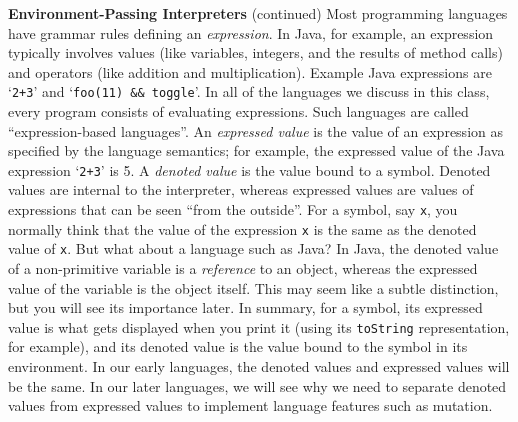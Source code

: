 \begin{minipage}[t]{\sw}
\slidenumber
\LARGE
{\bf Environment-Passing Interpreters} (continued)\exx
\Large
Most programming languages
have grammar rules defining an {\em expression}.
In Java, for example, an expression typically involves values
(like variables, integers, and the results of method calls) and operators
(like addition and multiplication).
Example Java expressions are `\verb'2+3'' and `\verb'foo(11) && toggle''.
In all of the languages we discuss in this class,
every program consists of evaluating expressions.
Such languages are called ``expression-based languages''.\exx
An {\em expressed value} is the value of an expression
as specified by the language semantics;
for example,
the expressed value of the Java expression `\verb'2+3'' is 5.
A {\em denoted value} is the value bound to a symbol.
Denoted values are internal to the interpreter,
whereas expressed values are values
of expressions that can be seen ``from the outside''.\exx
For a symbol, say \verb'x', you normally think
that the value of the expression \verb'x' is the same
as the denoted value of \verb'x'.
But what about a language such as Java?
In Java, the denoted value of a non-primitive variable
is a {\em reference} to an object,
whereas the expressed value of the variable
is the object itself.
This may seem like a subtle distinction,
but you will see its importance later.\exx
In summary, for a symbol,
its expressed value is what gets displayed when you print it
(using its \verb'toString' representation, for example),
and its denoted value is the value bound
to the symbol in its environment.
In our early languages, the denoted values and expressed values
will be the same.
In our later languages,
we will see why we need to separate denoted values
from expressed values to implement language features such as mutation.
\end{minipage}
\clearpage
